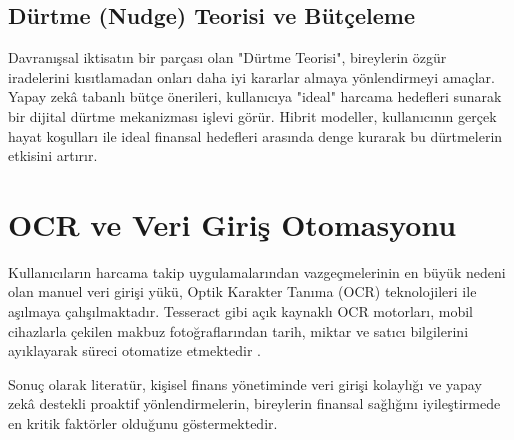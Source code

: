 \subsection{Dürtme (Nudge) Teorisi ve Bütçeleme}
Davranışsal iktisatın bir parçası olan "Dürtme Teorisi", bireylerin özgür iradelerini kısıtlamadan onları daha iyi kararlar almaya yönlendirmeyi amaçlar. Yapay zekâ tabanlı bütçe önerileri, kullanıcıya "ideal" harcama hedefleri sunarak bir dijital dürtme mekanizması işlevi görür. Hibrit modeller, kullanıcının gerçek hayat koşulları ile ideal finansal hedefleri arasında denge kurarak bu dürtmelerin etkisini artırır.

\section{OCR ve Veri Giriş Otomasyonu}

Kullanıcıların harcama takip uygulamalarından vazgeçmelerinin en büyük nedeni olan manuel veri girişi yükü, Optik Karakter Tanıma (OCR) teknolojileri ile aşılmaya çalışılmaktadır. Tesseract gibi açık kaynaklı OCR motorları, mobil cihazlarla çekilen makbuz fotoğraflarından tarih, miktar ve satıcı bilgilerini ayıklayarak süreci otomatize etmektedir \cite{harper2007}.

Sonuç olarak literatür, kişisel finans yönetiminde veri girişi kolaylığı ve yapay zekâ destekli proaktif yönlendirmelerin, bireylerin finansal sağlığını iyileştirmede en kritik faktörler olduğunu göstermektedir.
